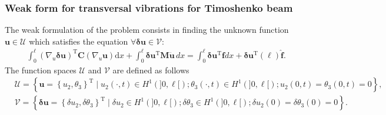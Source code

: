 \documentclass[aspectratio=169]{beamer}
\begin{document}
\begin{frame}
  \frametitle{Weak form for transversal vibrations for Timoshenko beam}
  The weak formulation of the problem consists in finding the unknown function $\mathbf{u} \in \mathcal U$ which satisfies the equation $\forall \boldsymbol\delta \mathbf{u} \in \mathcal{V}$:
  $$
    \begin{aligned}
       & \int_0^{\ell}\left(\nabla_u \boldsymbol\delta \mathbf{u}\right)^{\mathrm{T}} \mathbf{C}\left(\nabla_u \mathbf{u}\right) \mathrm{d} x+\int_0^{\ell} \boldsymbol\delta \mathbf{u}^{\mathrm{T}} \mathbf{M} \ddot{\mathbf{u}}\, d x =\int_0^{\ell} \boldsymbol\delta \mathbf{u}^{\mathrm{T}} \mathbf{f} d x+\boldsymbol\delta \mathbf{u}^{\mathrm{T}}(\ell)\mathbf{\hat f}.
    \end{aligned}
  $$
  The function spaces $\mathcal U$ and $\mathcal V$ are defined as follows
  $$
    \begin{aligned}
       & \mathcal U=\left\{\mathbf{u}=\left\{u_2, \theta_3\right\}^{\mathrm{T}} \mid u_2(\cdot,t) \in H^1(] 0, \ell[) ; \theta_3(\cdot,t) \in H^1(] 0, \ell[) ; u_2(0, t)=\theta_3(0, t)=0\right\},                                     \\
       & \mathcal V=\left\{\boldsymbol\delta \mathbf{u}=\left\{\delta u_2, \delta \theta_3\right\}^{\mathrm{T}} \mid \delta u_2 \in H^1(] 0, \ell[) ; \delta \theta_3 \in H^1(] 0, \ell[) ; \delta u_2(0)=\delta \theta_3(0)=0\right\}.
    \end{aligned}
  $$
\end{frame}
\end{document}
